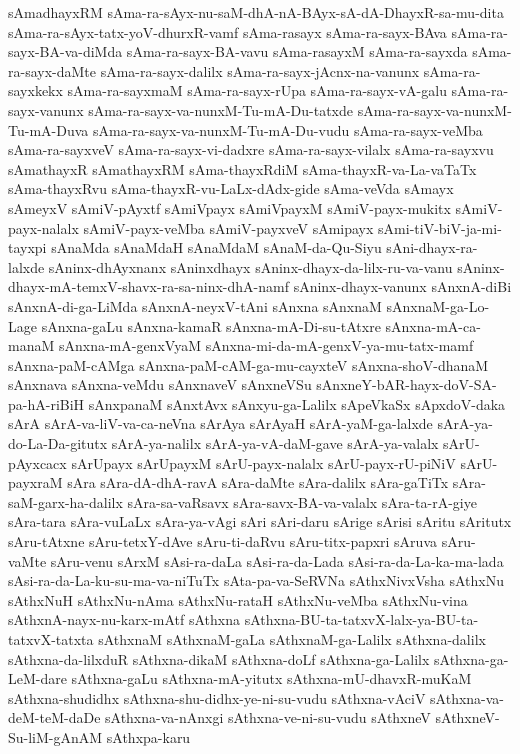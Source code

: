 {sAmadhayxRM
sAma-ra-sAyx-nu-saM-dhA-nA-BAyx-sA-dA-DhayxR-sa-mu-dita
sAma-ra-sAyx-tatx-yoV-dhurxR-vamf
sAma-rasayx
sAma-ra-sayx-BAva
sAma-ra-sayx-BA-va-diMda
sAma-ra-sayx-BA-vavu
sAma-rasayxM
sAma-ra-sayxda
sAma-ra-sayx-daMte
sAma-ra-sayx-dalilx
sAma-ra-sayx-jAcnx-na-vanunx
sAma-ra-sayxkekx
sAma-ra-sayxmaM
sAma-ra-sayx-rUpa
sAma-ra-sayx-vA-galu
sAma-ra-sayx-vanunx
sAma-ra-sayx-va-nunxM-Tu-mA-Du-tatxde
sAma-ra-sayx-va-nunxM-Tu-mA-Duva
sAma-ra-sayx-va-nunxM-Tu-mA-Du-vudu
sAma-ra-sayx-veMba
sAma-ra-sayxveV
sAma-ra-sayx-vi-dadxre
sAma-ra-sayx-vilalx
sAma-ra-sayxvu
sAmathayxR
sAmathayxRM
sAma-thayxRdiM
sAma-thayxR-va-La-vaTaTx
sAma-thayxRvu
sAma-thayxR-vu-LaLx-dAdx-gide
sAma-veVda
sAmayx
sAmeyxV
sAmiV-pAyxtf
sAmiVpayx
sAmiVpayxM
sAmiV-payx-mukitx
sAmiV-payx-nalalx
sAmiV-payx-veMba
sAmiV-payxveV
sAmipayx
sAmi-tiV-biV-ja-mi-tayxpi
sAnaMda
sAnaMdaH
sAnaMdaM
sAnaM-da-Qu-Siyu
sAni-dhayx-ra-lalxde
sAninx-dhAyxnanx
sAninxdhayx
sAninx-dhayx-da-lilx-ru-va-vanu
sAninx-dhayx-mA-temxV-shavx-ra-sa-ninx-dhA-namf
sAninx-dhayx-vanunx
sAnxnA-diBi
sAnxnA-di-ga-LiMda
sAnxnA-neyxV-tAni
sAnxna
sAnxnaM
sAnxnaM-ga-Lo-Lage
sAnxna-gaLu
sAnxna-kamaR
sAnxna-mA-Di-su-tAtxre
sAnxna-mA-ca-manaM
sAnxna-mA-genxVyaM
sAnxna-mi-da-mA-genxV-ya-mu-tatx-mamf
sAnxna-paM-cAMga
sAnxna-paM-cAM-ga-mu-cayxteV
sAnxna-shoV-dhanaM
sAnxnava
sAnxna-veMdu
sAnxnaveV
sAnxneVSu
sAnxneY-bAR-hayx-doV-SA-pa-hA-riBiH
sAnxpanaM
sAnxtAvx
sAnxyu-ga-Lalilx
sApeVkaSx
sApxdoV-daka
sArA
sArA-va-liV-va-ca-neVna
sArAya
sArAyaH
sArA-yaM-ga-lalxde
sArA-ya-do-La-Da-gitutx
sArA-ya-nalilx
sArA-ya-vA-daM-gave
sArA-ya-valalx
sArU-pAyxcacx
sArUpayx
sArUpayxM
sArU-payx-nalalx
sArU-payx-rU-piNiV
sArU-payxraM
sAra
sAra-dA-dhA-ravA
sAra-daMte
sAra-dalilx
sAra-gaTiTx
sAra-saM-garx-ha-dalilx
sAra-sa-vaRsavx
sAra-savx-BA-va-valalx
sAra-ta-rA-giye
sAra-tara
sAra-vuLaLx
sAra-ya-vAgi
sAri
sAri-daru
sArige
sArisi
sAritu
sAritutx
sAru-tAtxne
sAru-tetxY-dAve
sAru-ti-daRvu
sAru-titx-papxri
sAruva
sAru-vaMte
sAru-venu
sArxM
sAsi-ra-daLa
sAsi-ra-da-Lada
sAsi-ra-da-La-ka-ma-lada
sAsi-ra-da-La-ku-su-ma-va-niTuTx
sAta-pa-va-SeRVNa
sAthxNivxVsha
sAthxNu
sAthxNuH
sAthxNu-nAma
sAthxNu-rataH
sAthxNu-veMba
sAthxNu-vina
sAthxnA-nayx-nu-karx-mAtf
sAthxna
sAthxna-BU-ta-tatxvX-lalx-ya-BU-ta-tatxvX-tatxta
sAthxnaM
sAthxnaM-gaLa
sAthxnaM-ga-Lalilx
sAthxna-dalilx
sAthxna-da-lilxduR
sAthxna-dikaM
sAthxna-doLf
sAthxna-ga-Lalilx
sAthxna-ga-LeM-dare
sAthxna-gaLu
sAthxna-mA-yitutx
sAthxna-mU-dhavxR-muKaM
sAthxna-shudidhx
sAthxna-shu-didhx-ye-ni-su-vudu
sAthxna-vAciV
sAthxna-va-deM-teM-daDe
sAthxna-va-nAnxgi
sAthxna-ve-ni-su-vudu
sAthxneV
sAthxneV-Su-liM-gAnAM
sAthxpa-karu
}
